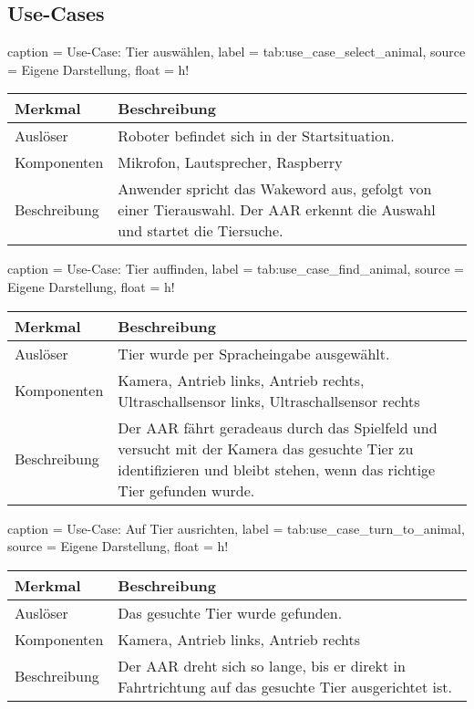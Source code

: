 \subsection{Use-Cases}


\begin{dhbwtable}{%
    caption	= Use-Case: Tier auswählen,
    label	= tab:use_case_select_animal,
    source	= Eigene Darstellung,
    float = h!
}
    \begin{tabularx}{\textwidth}{lX}
        \toprule
        \textbf{Merkmal}     & \textbf{Beschreibung}  \\\midrule
        Auslöser     & Roboter befindet sich in der Startsituation.\\
        Komponenten  & Mikrofon, Lautsprecher, Raspberry\\
        Beschreibung & Anwender spricht das Wakeword aus, gefolgt von einer Tierauswahl. Der \ac{AAR} erkennt die Auswahl und startet die Tiersuche.\\\bottomrule
    \end{tabularx}    
\end{dhbwtable}

\begin{dhbwtable}{%
    caption	= Use-Case: Tier auffinden,
    label	= tab:use_case_find_animal,
    source	= Eigene Darstellung,
    float = h!
}
    \begin{tabularx}{\textwidth}{lX}
        \toprule
        \textbf{Merkmal}     & \textbf{Beschreibung}  \\\midrule
        Auslöser     & Tier wurde per Spracheingabe ausgewählt.\\
        Komponenten  & Kamera, Antrieb links, Antrieb rechts, Ultraschallsensor links, Ultraschallsensor rechts\\
        Beschreibung & Der \ac{AAR} fährt geradeaus durch das Spielfeld und versucht mit der Kamera das gesuchte Tier zu identifizieren und bleibt stehen, wenn das richtige Tier gefunden wurde.\\\bottomrule
    \end{tabularx}    
\end{dhbwtable}

\begin{dhbwtable}{%
    caption	= Use-Case: Auf Tier ausrichten,
    label	= tab:use_case_turn_to_animal,
    source	= Eigene Darstellung,
    float = h!
}
    \begin{tabularx}{\textwidth}{lX}
        \toprule
        \textbf{Merkmal}     & \textbf{Beschreibung}  \\\midrule
        Auslöser     & Das gesuchte Tier wurde gefunden.\\
        Komponenten  & Kamera, Antrieb links, Antrieb rechts\\
        Beschreibung & Der \ac{AAR} dreht sich so lange, bis er direkt in Fahrtrichtung auf das gesuchte Tier ausgerichtet ist.\\\bottomrule
    \end{tabularx}    
\end{dhbwtable}

